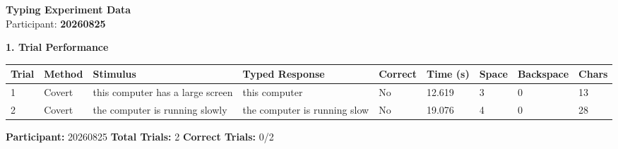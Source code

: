 \documentclass[10pt,a4paper]{article}
\begin{document}

\begin{center}
    {\Large\bfseries Typing Experiment Data}\\
    \vspace{2pt}
    Participant: \textbf{20260825}
\end{center}

\vspace{0.25cm}


\noindent
{\large\bfseries 1. Trial Performance}

\vspace{0.08cm}

\begin{center}
\begin{tabularx}{\textwidth}{
    C{0.45in}
    C{0.65in}
    L{2.35in}
    L{2.55in}
    C{0.65in}
    C{0.65in}
    C{0.55in}
    C{0.75in}
    C{0.55in}
}
\toprule

\textbf{Trial} &
\textbf{Method} &
\textbf{Stimulus} &
\textbf{Typed Response} &
\textbf{Correct} &
\textbf{Time (s)} &
\textbf{Space} &
\textbf{Backspace} &
\textbf{Chars}
\\

\midrule

1 &
Covert &
this computer has a large screen &
this computer &
No &
12.619 &
3 &
0 &
13
\\

2 &
Covert &
the computer is running slowly &
the computer is running slow &
No &
19.076 &
4 &
0 &
28
\\

\bottomrule
\end{tabularx}
\end{center}

\vfill


\noindent
\textbf{Participant:} 20260825
\hfill
\textbf{Total Trials:} 2
\hfill
\textbf{Correct Trials:} 0/2
\end{document}
